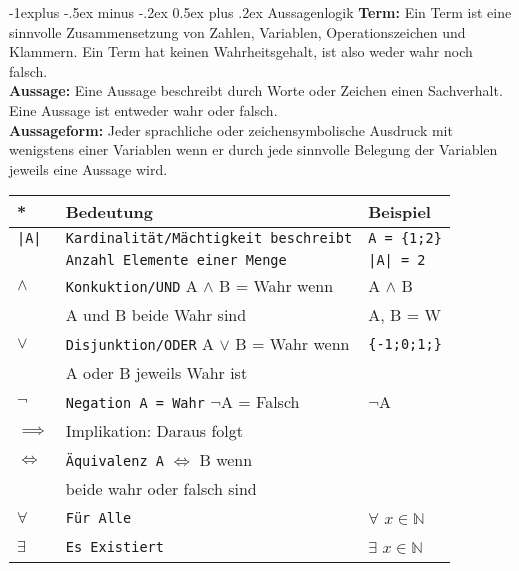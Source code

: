 \documentclass[10pt,landscape]{article}
\makeatletter
\renewcommand{\subsection}{\@startsection{subsection}{2}{0mm}%
                                {-1explus -.5ex minus -.2ex}%
                                {0.5ex plus .2ex}%
                                {\normalfont\normalsize\bfseries}}
\makeatother
\begin{document}
\begin{multicols}{3}
    \subsection{Aussagenlogik}
    \textbf{Term:}  Ein Term ist eine sinnvolle Zusammensetzung von Zahlen,
    Variablen, Operationszeichen und Klammern.
    Ein Term hat keinen Wahrheitsgehalt, ist also weder wahr noch falsch. \\[2mm]
    \textbf{Aussage:}
    Eine Aussage beschreibt durch Worte oder Zeichen einen Sachverhalt.
    Eine Aussage ist entweder wahr oder falsch. \\[2mm]
    \textbf{Aussageform:}
    Jeder sprachliche oder zeichensymbolische Ausdruck mit wenigstens einer Variablen
    wenn er durch jede sinnvolle Belegung der Variablen jeweils eine Aussage wird.
    \begin{tabular}{l|l|l}
        \textbf{*}            & \textbf{Bedeutung}                                & \textbf{Beispiel}             \\ \hline
        \verb!|A| !           & \verb!Kardinalität/Mächtigkeit beschreibt!        & \verb!A = {1;2}!              \\
                              & \verb!Anzahl Elemente einer Menge!                & \verb!|A| = 2!                \\ \hline
        $\land$               & \verb!Konkuktion/UND! A $\land$ B = Wahr wenn     & A $\land$ B                   \\
                              & A und B beide Wahr sind                           & A, B = W                      \\ \hline
        $\lor$                & \verb!Disjunktion/ODER!  A $\lor$ B  = Wahr wenn  & \verb!{-1;0;1;}!              \\
                              & A oder B  jeweils Wahr ist                        &                               \\ \hline
        $\neg$                & \verb!Negation A = Wahr! $\neg$A = Falsch         & $\neg $A                      \\\hline
        $\implies$            & Implikation: Daraus folgt                         &                               \\ \hline
        $\Longleftrightarrow$ & \verb!Äquivalenz A!  $\Longleftrightarrow$ B wenn &                               \\
                              & beide wahr oder falsch sind                       &                               \\ \hline
        $\forall$             & \verb!Für Alle!                                   & $\forall$ $x \in \mathbb{N}$  \\ \hline
        $\exists$             & \verb!Es Existiert!                               & $\exists $ $x \in \mathbb{N}$ \\ \hline
    \end{tabular}


\end{multicols}
\end{document}

